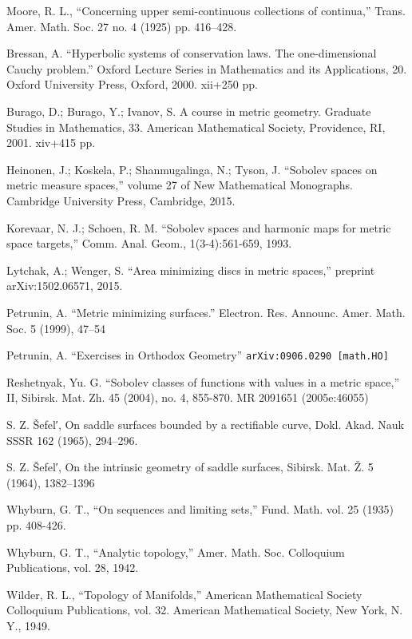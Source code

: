 \documentclass[a4paper,10pt]{amsart}
\begin{document}
\begin{thebibliography}{52}
Moore, R. L.,
``Concerning upper semi-continuous collections of continua,''
Trans. Amer. Math. Soc. 27 no. 4 (1925) pp. 416--428.

 Bressan, A.
``Hyperbolic systems of conservation laws.
The one-dimensional Cauchy problem.'' Oxford Lecture Series in Mathematics and its Applications, 20. Oxford University Press, Oxford, 2000. xii+250 pp.

Burago, D.; Burago, Y.; Ivanov, S.
A course in metric geometry.
Graduate Studies in Mathematics, 33. American Mathematical Society, Providence, RI, 2001. xiv+415 pp.

 Heinonen, J.;  Koskela, P.;  Shanmugalinga, N.; Tyson, J. ``Sobolev spaces on metric measure spaces,''
volume 27 of New Mathematical Monographs. Cambridge University Press, Cambridge, 2015.

Korevaar, N. J.; Schoen, R. M. ``Sobolev spaces and harmonic maps for metric space targets,'' Comm. Anal. Geom., 1(3-4):561-659, 1993.

Lytchak, A.; Wenger, S. ``Area minimizing discs in metric spaces,'' preprint arXiv:1502.06571, 2015.

 Petrunin, A.
``Metric minimizing surfaces.''
Electron. Res. Announc. Amer. Math. Soc. 5 (1999), 47--54 

 Petrunin, A. 
``Exercises in Orthodox Geometry''
{\tt arXiv:0906.0290 [math.HO]}

Reshetnyak, Yu. G. ``Sobolev classes of functions with values in a metric space,'' II, Sibirsk. Mat. Zh. 45 (2004), no. 4, 855-870. MR 2091651 (2005e:46055)

 S. Z. \v{S}efel′, On saddle surfaces bounded by a rectifiable curve, Dokl. Akad. Nauk SSSR 162 (1965), 294--296.

 S. Z. \v{S}efel′, On the intrinsic geometry of saddle surfaces, Sibirsk. Mat. Ž. 5 (1964), 1382--1396

Whyburn, G. T., ``On sequences and limiting sets,'' Fund. Math. vol. 25 (1935) pp. 408-426.

Whyburn, G. T., ``Analytic topology,'' Amer. Math. Soc. Colloquium Publications, vol. 28, 1942.

Wilder, R. L., ``Topology of Manifolds,'' American Mathematical Society Colloquium Publications, vol. 32. American Mathematical
Society, New York, N. Y., 1949.
\end{thebibliography}
\end{document}
